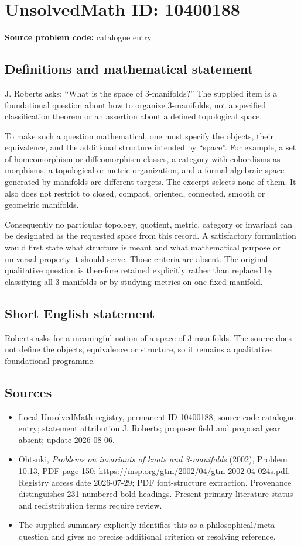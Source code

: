 \documentclass[11pt]{article}
\begin{document}
\section*{UnsolvedMath ID: 10400188}
\textbf{Source problem code:} catalogue entry
\subsection{Definitions and mathematical statement}
J. Roberts asks: ``What is the space of 3-manifolds?'' The supplied item is a foundational question about how to organize 3-manifolds, not a specified classification theorem or an assertion about a defined topological space.

To make such a question mathematical, one must specify the objects, their equivalence, and the additional structure intended by ``space''. For example, a set of homeomorphism or diffeomorphism classes, a category with cobordisms as morphisms, a topological or metric organization, and a formal algebraic space generated by manifolds are different targets. The excerpt selects none of them. It also does not restrict to closed, compact, oriented, connected, smooth or geometric manifolds.

Consequently no particular topology, quotient, metric, category or invariant can be designated as the requested space from this record. A satisfactory formulation would first state what structure is meant and what mathematical purpose or universal property it should serve. Those criteria are absent. The original qualitative question is therefore retained explicitly rather than replaced by classifying all 3-manifolds or by studying metrics on one fixed manifold.
\subsection{Short English statement}
Roberts asks for a meaningful notion of a space of 3-manifolds. The source does not define the objects, equivalence or structure, so it remains a qualitative foundational programme.
\subsection{Sources}
\begin{itemize}
\item Local UnsolvedMath registry, permanent ID 10400188, source code catalogue entry; statement attribution J. Roberts; proposer field and proposal year absent; update 2026-08-06.
\item Ohtsuki, \emph{Problems on invariants of knots and 3-manifolds} (2002), Problem 10.13, PDF page 150: \url{https://msp.org/gtm/2002/04/gtm-2002-04-024s.pdf}. Registry access date 2026-07-29; PDF font-structure extraction. Provenance distinguishes 231 numbered bold headings. Present primary-literature status and redistribution terms require review.
\item The supplied summary explicitly identifies this as a philosophical/meta question and gives no precise additional criterion or resolving reference.
\end{itemize}
\end{document}
